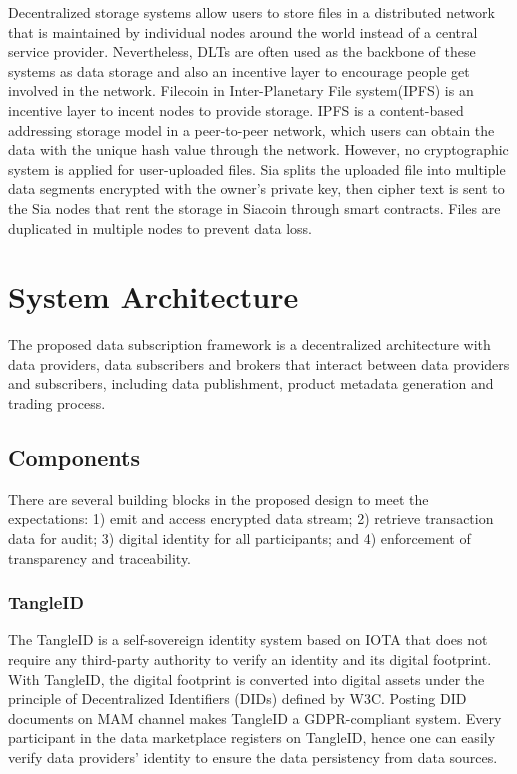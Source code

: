 \documentclass[conference]{IEEEtran}
\begin{document}
Decentralized storage systems allow users to store files in a distributed network that is maintained by individual nodes around the world instead of a central service provider. Nevertheless, DLTs are often used as the backbone of these systems as data storage and also an incentive layer to encourage people get involved in the network. Filecoin \cite{FileCoin} in Inter-Planetary File system(IPFS)\cite{IPFS} is an incentive layer to incent nodes to provide storage. IPFS is a content-based addressing storage model in a peer-to-peer network, which users can obtain the data with the unique hash value through the network. However, no cryptographic system is applied for user-uploaded files. Sia\cite{Sia} splits the uploaded file into multiple data segments encrypted with the owner's private key, then cipher text is sent to the Sia nodes that rent the storage in Siacoin through smart contracts. Files are duplicated in multiple nodes to prevent data loss.
 
\section{System Architecture}
The proposed data subscription framework\cite{MyDataMarketplace} is a decentralized architecture with data providers, data subscribers and brokers that interact between data providers and subscribers, including data publishment, product metadata generation and trading process.


\subsection{Components}
There are several building blocks in the proposed design to meet the expectations: 1) emit and access encrypted data stream; 2) retrieve transaction data for audit; 3) digital identity for all participants; and 4) enforcement of transparency and traceability.


\subsubsection{TangleID}
The TangleID\cite{TangleID} is a self-sovereign identity system based on IOTA that does not require any third-party authority to verify an identity and its digital footprint. With TangleID, the digital footprint is converted into digital assets under the principle of Decentralized Identifiers (DIDs)\cite{DID} defined by W3C. Posting DID documents on MAM channel makes TangleID a GDPR-compliant system\cite{GDPR}. Every participant in the data marketplace registers on TangleID, hence one can easily verify data providers' identity to ensure the data persistency from data sources.
\end{document}
